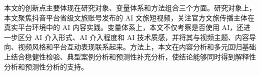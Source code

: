 
本文的创新点主要体现在研究对象、变量体系和方法组合三个方面。研究对象上，本文聚焦抖音平台省级文旅账号发布的 AI 文旅短视频，关注官方文旅传播主体在真实平台环境中的 AI 内容实践。变量体系上，本文不仅考察是否使用 AI，还进一步区分 AI 介入形式、AI 介入程度和 AI 技术质感，并将其与视频主题、内容导向、视频风格和平台互动表现联系起来。方法上，本文在内容分析和多元回归基础上结合稳健性检验、典型案例分析和预测性补充分析，使结论能够同时得到解释性分析和预测性分析的支持。
